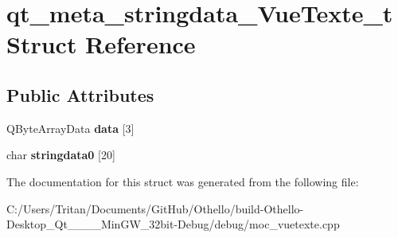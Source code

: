 \hypertarget{structqt__meta__stringdata___vue_texte__t}{}\section{qt\+\_\+meta\+\_\+stringdata\+\_\+\+Vue\+Texte\+\_\+t Struct Reference}
\label{structqt__meta__stringdata___vue_texte__t}
\subsection*{Public Attributes}
\begin{DoxyCompactItemize}
\item 
\hypertarget{structqt__meta__stringdata___vue_texte__t_af8e26fafe429bee89d7f1bea81dd7158}{}Q\+Byte\+Array\+Data {\bfseries data} \mbox{[}3\mbox{]}\label{structqt__meta__stringdata___vue_texte__t_af8e26fafe429bee89d7f1bea81dd7158}

\item 
\hypertarget{structqt__meta__stringdata___vue_texte__t_a17eb3ef0679ebe3616a2d53a973fc01c}{}char {\bfseries stringdata0} \mbox{[}20\mbox{]}\label{structqt__meta__stringdata___vue_texte__t_a17eb3ef0679ebe3616a2d53a973fc01c}

\end{DoxyCompactItemize}


The documentation for this struct was generated from the following file\+:\begin{DoxyCompactItemize}
\item 
C\+:/\+Users/\+Tritan/\+Documents/\+Git\+Hub/\+Othello/build-\/\+Othello-\/\+Desktop\+\_\+\+Qt\+\_\+\_\+\_\+\_\+\+Min\+G\+W\+\_\+32bit-\/\+Debug/debug/moc\+\_\+vuetexte.\+cpp\end{DoxyCompactItemize}
